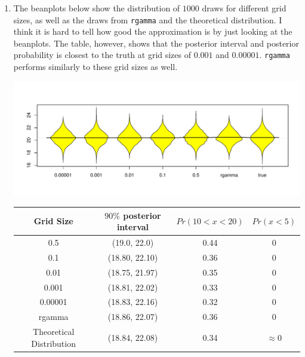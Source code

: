 \documentclass[12pt]{article}\usepackage[]{graphicx}\usepackage[]{color}
\newenvironment{knitrout}{}{} %
\begin{document}
\begin{doublespacing}
\begin{enumerate}
\begin{center}
\begin{knitrout}
\end{knitrout}
\end{center}

\item The beanplots below show the distribution of $1000$ draws for different grid sizes, as well as the draws from \verb+rgamma+ and the theoretical distribution. I think it is hard to tell how good the approximation is by just looking at the beanplots. The table, however, shows that the posterior interval and posterior probability is closest to the truth at grid sizes of $0.001$ and $0.00001$. \verb+rgamma+ performs similarly to these grid sizes as well.




\begin{knitrout}\footnotesize
{}\color{fgcolor}
\includegraphics[width=\linewidth]{figure/ciplot-1} 

\end{knitrout}



\begin{table}[H]
\centering
\begin{tabular} {c|c|c|c}
Grid Size & $90\%$ posterior interval & $Pr(10 < x < 20)$ & $Pr(x < 5)$ \\
\hline 
0.5 & (19.0, 22.0) & 0.44 & 0 \\
0.1 & (18.80, 22.10) & 0.36 & 0 \\
0.01 & (18.75, 21.97) & 0.35 & 0 \\
0.001 & (18.81, 22.02) & 0.33 & 0 \\
0.00001 & (18.83, 22.16) & 0.32 & 0 \\
rgamma & (18.86, 22.07) & 0.36 & 0 \\
Theoretical Distribution & (18.84, 22.08) & 0.34 & $\approx 0$ \\
\hline
\end{tabular}
\end{table}


\end{enumerate}
\end{doublespacing}
\end{document}
